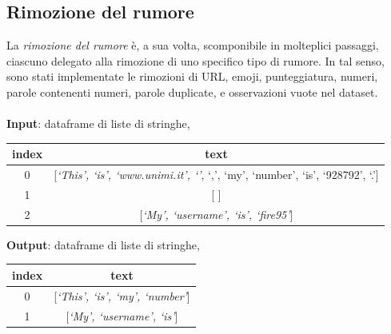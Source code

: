 \documentclass[12pt]{report}
\theoremstyle{definition}
\begin{document}
\subsection{Rimozione del rumore}
La \textit{rimozione del rumore} è, a sua volta, scomponibile in molteplici passaggi, ciascuno delegato alla rimozione di uno specifico tipo di rumore.
In tal senso, sono stati implementate le rimozioni di URL, emoji, punteggiatura, numeri, parole contenenti numeri, parole duplicate, e osservazioni vuote nel dataset. 
\\
\\
\textbf{Input}: dataframe di liste di stringhe,
\begin{center}
    \begin{tabular}{|c|c|}
    \hline
    \textbf{index} & \textbf{text} \\
    \hline
         0 & [\textit{`This', `is', `www.unimi.it', `\smiley{}'}, `,', `my', `number', `is', `928792', `.']\\
         1 & [\textit{ }] \\
         2 & [\textit{`My', `username', `is', `fire95'}] \\
    \hline
    \end{tabular}
\end{center}
\textbf{Output}: dataframe di liste di stringhe,
\begin{center}
    \begin{tabular}{|c|c|}
    \hline
    \textbf{index} & \textbf{text} \\
    \hline
         0 & [\textit{`This', `is', `my', `number'}]\\
         1 & [\textit{`My', `username', `is'}] \\
    \hline
    \end{tabular}
\end{center}
\end{document}
